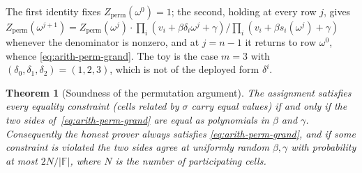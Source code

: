 \documentclass[11pt,a4paper]{article}
\newtheorem{theorem}{Theorem}[section]
\theoremstyle{definition}
\newcommand{\F}{\mathbb{F}}
\begin{document}
The first identity fixes $Z_{\mathrm{perm}}(\omega^0) = 1$; the second,
holding at every row $j$, gives
$Z_{\mathrm{perm}}(\omega^{j+1}) = Z_{\mathrm{perm}}(\omega^j)\cdot
 \prod_i (v_i + \beta\delta_i\omega^j + \gamma) /
 \prod_i (v_i + \beta s_i(\omega^j) + \gamma)$ whenever the denominator
is nonzero, and at $j = n - 1$ it returns to row $\omega^0$, whence
\eqref{eq:arith-perm-grand}. The toy is the case $m = 3$ with
$(\delta_0, \delta_1, \delta_2) = (1, 2, 3)$, which is not of the deployed
form $\delta^i$.

\begin{theorem}[Soundness of the permutation argument]
\label{thm:arith-perm}
The assignment satisfies every equality constraint (cells related by
$\sigma$ carry equal values) if and only if the two sides
of~\eqref{eq:arith-perm-grand} are equal as polynomials in $\beta$ and
$\gamma$. Consequently the honest prover always satisfies
\eqref{eq:arith-perm-grand}, and if some constraint is violated the two
sides agree at uniformly random $\beta, \gamma$ with probability at most
$2N / |\F|$, where $N$ is the number of participating cells.
\end{theorem}
\end{document}
